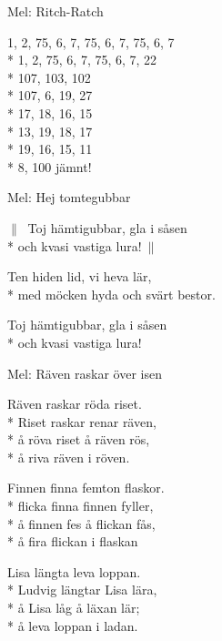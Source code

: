 \pagestyle{Tungrullare}
\begin{SongText}[Siffervisan]
\begin{SongInfo}
Mel: Ritch-Ratch
\end{SongInfo}
\begin{SongVerse}
1, 2, 75, 6, 7, 75, 6, 7, 75, 6, 7\\*%
1, 2, 75, 6, 7, 75, 6, 7, 22\\*%
107, 103, 102\\*%
107, 6, 19, 27\\*%
17, 18, 16, 15\\*%
13, 19, 18, 17\\*%
19, 16, 15, 11\\*%
8, 100 jämnt!
\end{SongVerse}
\end{SongText}
\begin{SongText}
\begin{SongInfo}
Mel: Hej tomtegubbar
\end{SongInfo}
\begin{SongVerse}
$\|\:$ Toj hämtigubbar, gla i såsen\\*%
och kvasi vastiga lura!$\:\|$
\end{SongVerse}
\begin{SongVerse}
Ten hiden lid, vi heva lär,\\*%
med möcken hyda och svärt bestor.
\end{SongVerse}
\begin{SongVerse}
Toj hämtigubbar, gla i såsen\\*%
och kvasi vastiga lura!
\end{SongVerse}
\end{SongText}
\begin{SongText}
\begin{SongInfo}
Mel: Räven raskar över isen
\end{SongInfo}
\begin{SongVerse}
Räven raskar röda riset.\\*%
Riset raskar renar räven,\\*%
å röva riset å räven rös,\\*%
å riva räven i röven.
\end{SongVerse}
\begin{SongVerse}
Finnen finna femton flaskor.\\*%
flicka finna finnen fyller,\\*%
å finnen fes å flickan fås,\\*%
å fira flickan i flaskan
\end{SongVerse}
\begin{SongVerse}
Lisa längta leva loppan.\\*%
Ludvig längtar Lisa lära,\\*%
å Lisa låg å läxan lär;\\*%
å leva loppan i ladan.
\end{SongVerse}
\end{SongText}
\newpage